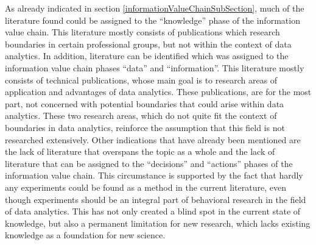 As already indicated in section \ref{informationValueChainSubSection}, much of the literature found could be assigned to the \enquote{knowledge} phase of the information value chain. This literature mostly consists of publications which research boundaries in certain professional groups, but not within the context of data analytics. In addition, literature can be identified which was assigned to the information value chain phases \enquote{data} and \enquote{information}. This literature mostly consists of technical publications, whose main goal is to research areas of application and advantages of data analytics. These publications, are for the most part, not concerned with potential boundaries that could arise within data analytics. These two research areas, which do not quite fit the context of boundaries in data analytics, reinforce the assumption that this field is not researched extensively. Other indications that have already been mentioned are the lack of literature that overspans the topic as a whole and the lack of literature that can be assigned to the \enquote{decisions} and \enquote{actions} phases of the information value chain. This circumstance is supported by the fact that hardly any experiments could be found as a method in the current literature, even though experiments should be an integral part of behavioral research in the field of data analytics. This has not only created a blind spot in the current state of knowledge, but also a permanent limitation for new research, which lacks existing knowledge as a foundation for new science. %



